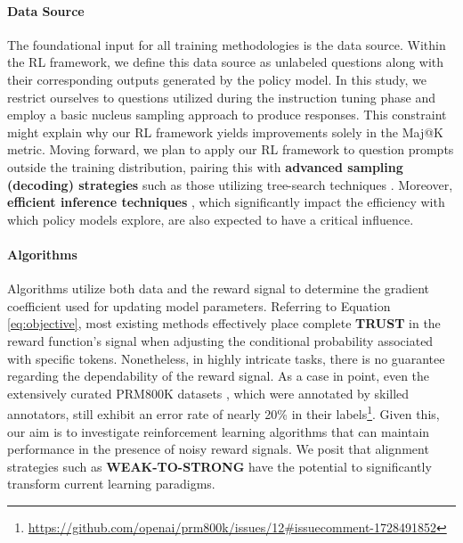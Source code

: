 \begin{itemize}[topsep=0pt]
\begin{itemize}[topsep=0pt]
\paragraph{Data Source} The foundational input for all training methodologies is the data source. Within the RL framework, we define this data source as unlabeled questions along with their corresponding outputs generated by the policy model. In this study, we restrict ourselves to questions utilized during the instruction tuning phase and employ a basic nucleus sampling approach to produce responses. This constraint might explain why our RL framework yields improvements solely in the Maj@K metric. Moving forward, we plan to apply our RL framework to question prompts outside the training distribution, pairing this with \textbf{advanced sampling (decoding) strategies} such as those utilizing tree-search techniques \citep{yao2023tree}. Moreover, \textbf{efficient inference techniques} \citep{xia-etal-2023-speculative,leviathan2023fast,kwon2023efficient,xia2024unlocking}, which significantly impact the efficiency with which policy models explore, are also expected to have a critical influence.

\paragraph{Algorithms} Algorithms utilize both data and the reward signal to determine the gradient coefficient used for updating model parameters. Referring to Equation \ref{eq:objective}, most existing methods effectively place complete \textbf{TRUST} in the reward function's signal when adjusting the conditional probability associated with specific tokens. Nonetheless, in highly intricate tasks, there is no guarantee regarding the dependability of the reward signal. As a case in point, even the extensively curated PRM800K datasets \citep{lightman2023let}, which were annotated by skilled annotators, still exhibit an error rate of nearly 20\% in their labels\footnote{\url{https://github.com/openai/prm800k/issues/12\#issuecomment-1728491852}}. Given this, our aim is to investigate reinforcement learning algorithms that can maintain performance in the presence of noisy reward signals. We posit that alignment strategies such as \textbf{WEAK-TO-STRONG} \citep{burns2023weak} have the potential to significantly transform current learning paradigms.


\end{itemize}
\end{itemize}
